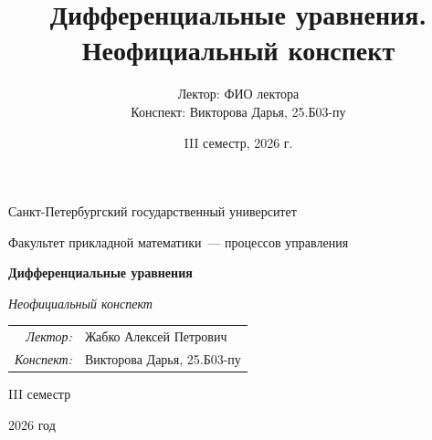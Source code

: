 \documentclass[12pt,a4paper]{report}
\title{Дифференциальные уравнения. Неофициальный конспект}
\author{Лектор: ФИО лектора\\
Конспект: Викторова Дарья, 25.Б03-пу}
\date{III семестр, 2026 г.}
\begin{document}
\begin{titlepage}
    \thispagestyle{empty}
    \begin{center}
        \vspace*{0.6cm}

        {\large Санкт-Петербургский государственный университет\par}
        \vspace{0.35em}
        {\normalsize Факультет прикладной математики~--- процессов управления\par}

        \vspace*{5.1cm}

        {\fontsize{30}{35}\selectfont\bfseries Дифференциальные уравнения\par}
        \vspace{0.65em}
        {\fontsize{17}{21}\selectfont\itshape Неофициальный конспект\par}

        \vspace{2.7cm}

        {\normalsize
        \begin{tabular}{@{}rl@{}}
            \textit{Лектор:} & Жабко Алексей Петрович \\
            \textit{Конспект:} & Викторова Дарья, 25.Б03-пу
        \end{tabular}\par}

        \vfill

        {\large III семестр\par}
        \vspace{0.22em}
        {\large 2026 год\par}
        \vspace*{0.55cm}
    \end{center}
\end{titlepage}

\tableofcontents
\newpage

\setcounter{lection}{0}

\end{document}
